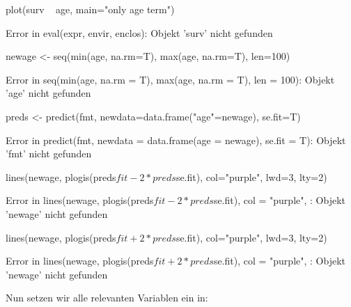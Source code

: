 \documentclass[a4paper,twoside]{tufte-book}\usepackage[]{graphicx}\usepackage[]{color}
\begin{document}
\begin{appendices}
\begin{Schunk}
\begin{Sinput}
plot(surv ~ age, main="only age term")
\end{Sinput}
\begin{Soutput}
Error in eval(expr, envir, enclos): Objekt 'surv' nicht gefunden
\end{Soutput}
\begin{Sinput}
newage <- seq(min(age, na.rm=T), max(age, na.rm=T), len=100)
\end{Sinput}
\begin{Soutput}
Error in seq(min(age, na.rm = T), max(age, na.rm = T), len = 100): Objekt 'age' nicht gefunden
\end{Soutput}
\begin{Sinput}
preds <- predict(fmt, newdata=data.frame("age"=newage), se.fit=T)
\end{Sinput}
\begin{Soutput}
Error in predict(fmt, newdata = data.frame(age = newage), se.fit = T): Objekt 'fmt' nicht gefunden
\end{Soutput}
\begin{Sinput}
lines(newage, plogis(preds$fit-2*preds$se.fit), col="purple", lwd=3, lty=2)
\end{Sinput}
\begin{Soutput}
Error in lines(newage, plogis(preds$fit - 2 * preds$se.fit), col = "purple", : Objekt 'newage' nicht gefunden
\end{Soutput}
\begin{Sinput}
lines(newage, plogis(preds$fit+2*preds$se.fit), col="purple", lwd=3, lty=2)
\end{Sinput}
\begin{Soutput}
Error in lines(newage, plogis(preds$fit + 2 * preds$se.fit), col = "purple", : Objekt 'newage' nicht gefunden
\end{Soutput}
\end{Schunk}

Nun setzen wir alle relevanten Variablen ein in:


\end{appendices}
\end{document}
